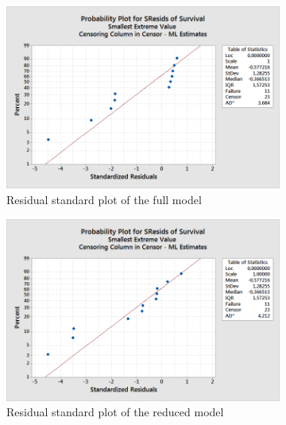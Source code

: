 \documentclass[10pt, a4paper]{article}
\begin{document}
\begin{figure}
         \centering
         \begin{subfigure}[b]{0.4\textwidth}
                 \includegraphics[width=\textwidth]{stdful}
                 \caption{Residual standard plot of the full model}
                 \label{stdful}
         \end{subfigure}
         \begin{subfigure}[b]{0.4\textwidth}
                 \includegraphics[width=\textwidth]{stdred}
                 \caption{Residual standard plot of the reduced model}
                 \label{stdred}
         \end{subfigure}
         \\
         \begin{subfigure}[b]{0.4\textwidth}

\end{subfigure}
\end{figure}
\end{document}
